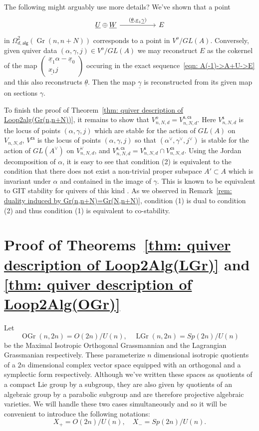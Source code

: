 \documentclass{amsart}
\theoremstyle{definition}
\newcommand{\UL}[1]{\underline{#1}}
\newcommand{\alg}{\mathsf{alg}}
\newcommand{\stable}{\mathsf{s}}
\newcommand{\costable}{\mathsf{cs}}
\newcommand{\Gr}{\operatorname{Gr}}
\newcommand{\LGr}{\operatorname{LGr}}
\newcommand{\OGr}{\operatorname{OGr}}
\newcommand{\LoopTwo}{\Omega^{2}_{d,\alg}}
\begin{document}
{\color{red} The following might arguably use more details?}  
We've shown that a point
\[
\begin{tikzcd}[column sep={8em,between origins}]
\UL{U}\oplus \UL{W} \arrow{r}{(\UL{\theta },\UL{x}_{1}\UL{\gamma})} &E 
\end{tikzcd}
\]
in $\LoopTwo (\Gr (n,n+N))$ corresponds to a point in
$V^{o}/GL(A)$. Conversely, given quiver data $(\alpha ,\gamma ,j)\in
V^{o}/GL(A)$ we may reconstruct $E$ as the cokernel of the map
$\begin{pmatrix}\UL{x}_{1}\alpha -\UL{x}_{0}\\
\UL{x_{1}}j   \end{pmatrix} $ occuring in the exact
sequence~\eqref{eqn: A(-1)->A+U->E} and this also reconstructs
$\UL{\theta}$. Then the map $\UL{\gamma}$ is reconstructed from its
given map on sections $\gamma$.



To finish the proof of Theorem~\ref{thm: quiver description of
Loop2alg(Gr(n,n+N))}, it remains to show that $V^{o}_{n,N,d} =
V^{\stable,\costable}_{n,N,d}$.  Here $V^{\stable}_{n,N,d}$ is the
locus of points $(\alpha ,\gamma ,j)$ which are stable for the action
of $GL(A)$ on $V_{n,N,d}$, $V^{\costable}$ is the locus of points
$(\alpha ,\gamma ,j)$ so that $(\alpha^{\vee},\gamma^{\vee},j^{\vee})$
is stable for the action of $GL(A^{\vee})$ on $V^{\vee}_{n,N,d}$, and
$V^{\stable,\costable}_{n,N,d} = V^{\stable}_{n,N,d}\cap
V^{\costable}_{n,N,d}$. Using the Jordan decomposition of $\alpha$, it
is easy to see that condition (2) is equivalent to the condition that
there does not exist a non-trivial proper subspace $A'\subset A$ which
is invariant under $\alpha$ and contained in the image of
$\gamma$. This is known to be equivalent to GIT stability for quivers
of this kind \cite[Def.~2.2]{Nakajima-Handsaw}. As we observed in
Remark~\ref{rem: duality induced by Gr(n,n+N)=Gr(N,n+N)}, condition
(1) is dual to condition (2) and thus condition (1) is equivalent to
co-stability. 






\section{Proof of Theorems~\ref{thm: quiver description of
Loop2Alg(LGr)} and \ref{thm: quiver description of
Loop2Alg(OGr)}}\label{sec: proofs of the Omega2(LG/OG) theorems}

Let 
\[
 \OGr (n,2n) = O(2n)/U(n), \quad \LGr (n,2n) = Sp(2n)/U(n)
\]
be the Maximal Isotropic Orthogonal Grassmannian and the Lagrangian
Grassmanian respectively. These parameterize $n$ dimensional isotropic
quotients of a $2n$ dimensional complex vector space equipped with an
orthogonal and a symplectic form respectively. Although we've written
these spaces as quotients of a compact Lie group by a subgroup, they
are also given by quotients of an algebraic group by a parabolic
subgroup and are therefore projective algebraic varieties. We will
handle these two cases simultaneously and so it will be convenient to
introduce the following notations:
\[
X_{+} = O(2n)/U(n), \quad X_{-} = Sp(2n)/U(n).
\]
\end{document}

